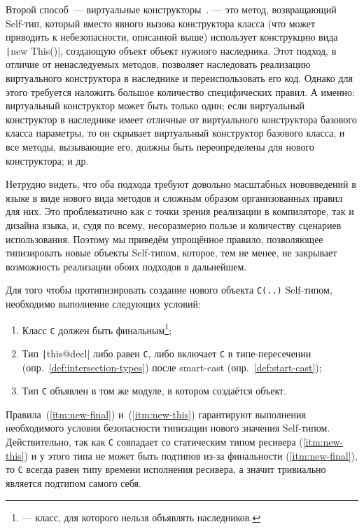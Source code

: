 Второй способ~--- виртуальные конструкторы~\cite{ryu2016thistype}.
 --- это метод, возвращающий Self-тип, который вместо явного вызова конструктора класса (что может приводить к небезопасности, описанной выше) использует конструкцию вида \texttt|new This()|, создающую объект объект нужного наследника.
Этот подход, в отличие от ненаследуемых методов, позволяет наследовать реализацию виртуального конструктора в наследнике и переиспользовать его код.
Однако для этого требуется наложить большое количество специфических правил.
А именно: виртуальный конструктор может быть только один; если виртуальный конструктор в наследнике имеет отличные от виртуального конструктора базового класса параметры, то он скрывает виртуальный конструктор базового класса, и все методы, вызывающие его, должны быть переопределены для нового конструктора; и др.

Нетрудно видеть, что оба подхода требуют довольно масштабных нововведений в языке в виде нового вида методов и сложным образом организованных правил для них.
Это проблематично как с точки зрения реализации в компиляторе, так и дизайна языка, и, судя по всему, несоразмерно пользе и количеству сценариев использования.
Поэтому мы приведём упрощённое правило, позволяющее типизировать новые объекты Self-типом, которое, тем не менее, не закрывает возможность реализации обоих подходов в дальнейшем.

Для того чтобы протипизировать создание нового объекта \texttt{C(..)} Self-типом, необходимо выполнение следующих условий:

\begin{enumerate}
    \item \label{itm:new-final} Класс \texttt{C} должен быть финальным\footnote{ --- класс, для которого нельзя объявлять наследников.};
    \item \label{itm:new-this} Тип \texttt|this@decl| либо равен \texttt{С}, либо включает \texttt{C} в типе-пересечении (опр.~\ref{def:intersection-types}) после smart-cast (опр.~\ref{def:start-cast});
    \item \label{itm:new-module} Тип \texttt{C} объявлен в том же модуле, в котором создаётся объект.
\end{enumerate}

Правила~(\ref{itm:new-final}) и~(\ref{itm:new-this}) гарантируют выполнения необходимого условия безопасности типизации нового значения Self-типом.
Действительно, так как \texttt{C} совпадает со статическим типом ресивера (\ref{itm:new-this}) и у этого типа не может быть подтипов из-за финальности (\ref{itm:new-final}), то \texttt{C} всегда равен типу времени исполнения ресивера, а значит тривиально является подтипом самого себя.

